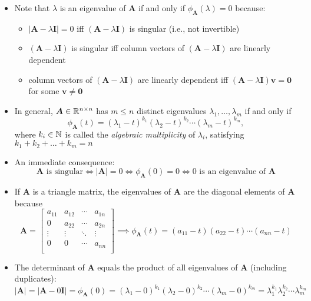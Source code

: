 \documentclass[12pt,a4paper]{article}
\begin{document}
\begin{itemize}
  \begin{itemize}
  \item Note that $\lambda$ is an eigenvalue of $\bm{A}$
    if and only if $\phi_{\bm{A}}(\lambda)=0$ because:
    \begin{itemize}
    \item $|\bm{A}-\lambda \bm{I}| = 0$ iff $(\bm{A}-\lambda\bm{I})$ is singular (i.e., not invertible)
    \item $(\bm{A}-\lambda\bm{I})$ is singular iff column vectors of $(\bm{A}-\lambda\bm{I})$ are linearly dependent
    \item column vectors of $(\bm{A}-\lambda\bm{I})$ are linearly dependent iff $(\bm{A}-\lambda\bm{I})\bm{v}=\bm{0}$ for some $\bm{v}\neq \bm{0}$
    \end{itemize}
  \item In general, $\bm{A}\in \mathbb{R}^{n\times n}$ has $m\leq n$ distinct eigenvalues $\lambda_{1},\ldots, \lambda_{m}$ if and only if
    \begin{equation}\nonumber%
      \phi_{\bm{A}}(t) = (\lambda_{1}-t)^{k_{1}}(\lambda_{2}-t)^{k_{2}}\cdots(\lambda_{m}-t)^{k_{m}},
    \end{equation}
    where $k_{i}\in \mathbb{N}$ is called the \emph{algebraic multiplicity} of $\lambda_{i}$,
    satisfying $k_{1}+k_{2}+\ldots+k_{m}=n$
  \item An immediate consequence:
    \begin{equation}\nonumber%
      \text{$\bm{A}$ is singular}
      \iff
      |\bm{A}| = 0
      \iff \phi_{\bm{A}}(0) = 0
      \iff \text{$0$ is an eigenvalue of $\bm{A}$}
    \end{equation}
  \item If $\bm{A}$ is a triangle matrix,
    the eigenvalues of $\bm{A}$ are the diagonal elements of $\bm{A}$ because
    \begin{equation}\nonumber%
      \bm{A} =
      \begin{bmatrix}
        a_{11} & a_{12} & \cdots & a_{1n} \\
        0 & a_{22} & \cdots & a_{2n} \\
        \vdots & \vdots & \ddots & \vdots \\
        0  & 0 & \cdots & a_{nn} \\
      \end{bmatrix}
      \implies
      \phi_{\bm{A}}(t)
      = (a_{11}-t)(a_{22}-t)\cdots (a_{nn}-t)
    \end{equation}
  \item The determinant of $\bm{A}$ equals the product of all eigenvalues of $\bm{A}$ (including duplicates):
    \begin{equation}\nonumber%
      |\bm{A}| = |\bm{A}-0\bm{I}|
      = \phi_{\bm{A}}(0)
      = (\lambda_{1}-0)^{k_{1}}(\lambda_{2}-0)^{k_{2}}\cdots(\lambda_{m}-0)^{k_{m}}
      = \lambda_{1}^{k_{1}}\lambda_{2}^{k_{2}}\cdots\lambda_{m}^{k_{m}}
    \end{equation}
    

\end{itemize}
\end{itemize}
\end{document}
